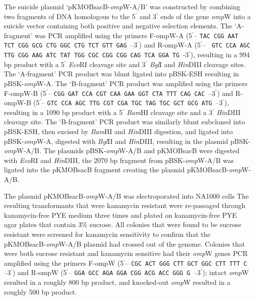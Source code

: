 The suicide plasmid `pKMOBsacB-\textit{omp}W-A/B' was constructed by combining two fragments of DNA homologous to the 5$^\prime$ and 3$^\prime$ ends of the gene \textit{omp}W into a suicide vector containing both positive and negative selection elements. The `A-fragment' was \ac{PCR} amplified using the primers F-ompW-A (5$^\prime$\!-- \texttt{TAC CGG AAT TCT CGG GCG CTG GGC CTG TCT GTT GAG }--3$^\prime$) and R-ompW-A (5$^\prime$\!-- \texttt{ GTC CCA AGC TTG CGG AAG ATC TAT TGG CGC CGG CGG CAG TCA GGA TG }-3$^\prime$), resulting in a 994 bp product with a 5$^\prime$ \textit{Eco}RI cleavage site and  3$^\prime$ \textit{Bgl}I and \textit{Hin}DIII cleavage sites.  The `A-fragment' \ac{PCR} product was blunt ligated into pBSK-ESH resulting in pBSK-\textit{omp}W-A. The `B-fragment' PCR product was amplified using the primers F-ompW-B (5$^\prime$\!-- \texttt{CGG GAT CCA CGT CAA GAA GGT CTA TTT CAG CAC }--3$^\prime$) and R-ompW-B (5$^\prime$\!-- \texttt{GTC CCA AGC TTG CGT CGA TGC TAG TGC GCT GCG ATG }--3$^\prime$), resulting in a 1090 bp product with a 5$^\prime$ \textit{Bam}HI cleavage site and a 3$^\prime$ \textit{Hin}DIII cleavage site. The `B-fragment' \ac{PCR} product was similarly blunt subcloned into pBSK-ESH, then excised by \textit{Bam}HI and \textit{Hin}DIII digestion, and ligated into pBSK-\textit{omp}W-A, digested with \textit{Bgl}II and \textit{Hin}DIII, resulting in the plasmid pBSK-\textit{omp}W-A/B. The plasmids pBSK-\textit{omp}W-A/B and pKMOBsacB were digested with \textit{Eco}RI and \textit{Hin}DIII, the 2070 bp fragment from pBSK-\textit{omp}W-A/B was ligated into the pKMOBsacB fragment creating the plasmid pKMOBsacB-\textit{omp}W-A/B.

The plasmid pKMOBsacB-\textit{omp}W-A/B was electroporated into \caulobacter NA1000
cells The resulting transformants that
were kanamycin resistant were re-passaged through kanamycin-free \ac{PYE} medium
three times and plated on kanamycin-free \ac{PYE} agar plates that contain 3\%
sucrose. All colonies that were found to be sucrose resistant were screened for
kanamycin sensitivity to confirm that the pKMOBsacB-\textit{omp}W-A/B plasmid had crossed
out of the genome. Colonies that were both sucrose resistant and kanamycin
sensitive had their \textit{omp}W genes \ac{PCR} amplified using the primers F-ompW
(5$^\prime$\!-- \texttt{CGC ACT GGG CTT GCT GGC CTT TTT C }--3$^\prime$) and
R-ompW (5$^\prime$\!-- \texttt{GGA GCC AGA GGA CGG ACG ACC GGG G }--3$^\prime$); intact \textit{omp}W resulted in a roughly 800 bp product, and knocked-out \textit{omp}W resulted in a roughly 500 bp product.



